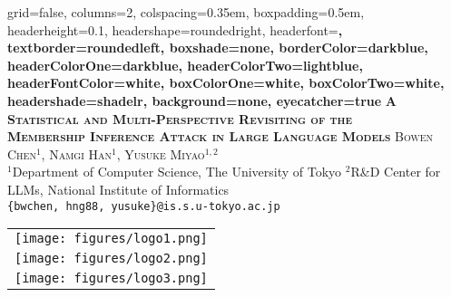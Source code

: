 \documentclass[a0paper,portrait]{baposter}
\begin{document}
\begin{poster}{
  grid=false,
  columns=2,
  colspacing=0.35em,
  boxpadding=0.5em,
  headerheight=0.1\textheight,
  headershape=roundedright,
  headerfont=\Large\bf\textsc,
  textborder=roundedleft,
  boxshade=none,
  borderColor=darkblue,
  headerColorOne=darkblue,
  headerColorTwo=lightblue,
  headerFontColor=white,
  boxColorOne=white,
  boxColorTwo=white,
  headershade=shadelr,
  background=none,
  eyecatcher=true
}
{}
{\Large\bf\textsc{A Statistical and Multi-Perspective Revisiting of the\\Membership Inference Attack in Large Language Models}\vspace{0.2em}}
{\normalsize\textsc{Bowen Chen$^{1}$, Namgi Han$^{1}$, Yusuke Miyao$^{1,2}$}\vspace{0.15em}\\
\small $^1$Department of Computer Science, The University of Tokyo \quad $^2$R\&D Center for LLMs, National Institute of Informatics\\
\small\texttt{\{bwchen, hng88, yusuke\}@is.s.u-tokyo.ac.jp}
}
{\begin{tabular}{l}
\texttt{[image: figures/logo1.png]} \\
\texttt{[image: figures/logo2.png]} \\
\texttt{[image: figures/logo3.png]}
\end{tabular}}

\end{poster}
\end{document}
